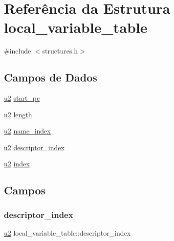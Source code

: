 \hypertarget{structlocal__variable__table}{}\section{Referência da Estrutura local\+\_\+variable\+\_\+table}
\label{structlocal__variable__table}


{\ttfamily \#include $<$structures.\+h$>$}

\subsection*{Campos de Dados}
\begin{DoxyCompactItemize}
\item 
\hyperlink{lista__operandos_8h_a732cde1300aafb73b0ea6c2558a7a54f}{u2} \hyperlink{structlocal__variable__table_aa86e910619df9b3284535529bc887a12}{start\+\_\+pc}
\item 
\hyperlink{lista__operandos_8h_a732cde1300aafb73b0ea6c2558a7a54f}{u2} \hyperlink{structlocal__variable__table_a76b778cea6d99b0854cba21e223569cc}{length}
\item 
\hyperlink{lista__operandos_8h_a732cde1300aafb73b0ea6c2558a7a54f}{u2} \hyperlink{structlocal__variable__table_a6c91f7b672683a35b1433c429de69069}{name\+\_\+index}
\item 
\hyperlink{lista__operandos_8h_a732cde1300aafb73b0ea6c2558a7a54f}{u2} \hyperlink{structlocal__variable__table_adb823a30762d64e9d20f674ae7923bfc}{descriptor\+\_\+index}
\item 
\hyperlink{lista__operandos_8h_a732cde1300aafb73b0ea6c2558a7a54f}{u2} \hyperlink{structlocal__variable__table_af13a15b5fbb398323997b88d341a6c38}{index}
\end{DoxyCompactItemize}


\subsection{Campos}
\mbox{\label{structlocal__variable__table_adb823a30762d64e9d20f674ae7923bfc}} 
\subsubsection{\texorpdfstring{descriptor\+\_\+index}{descriptor\_index}}
{\footnotesize\ttfamily \hyperlink{lista__operandos_8h_a732cde1300aafb73b0ea6c2558a7a54f}{u2} local\+\_\+variable\+\_\+table\+::descriptor\+\_\+index}

